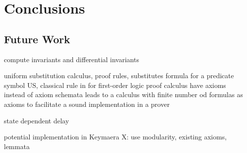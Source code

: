 \chapter{Conclusions}
    \section{Future Work}
    	compute invariants and differential invariants

    	uniform substitution calculus, proof rules, substitutes formula for a predicate symbol
    	US, classical rule in for first-order logic proof calculus
    	have axioms instead of axiom schemata
    	leads to a calculus with finite number od \ddL formulas as axioms
    	to facilitate a sound implementation in a prover

    	state dependent delay

    potential implementation in Keymaera X: use modularity, existing axioms, lemmata